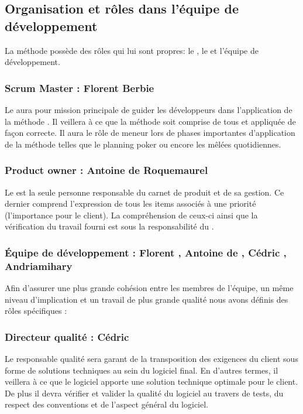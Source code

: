 \subsection{Organisation et rôles dans l'équipe de développement}
La méthode  possède des rôles qui lui sont propres: le , le  et l'équipe de développement. 

\subsubsection{Scrum Master : Florent Berbie}
Le  aura pour mission principale de guider les développeurs dans l'application de la méthode . Il veillera à ce que la méthode soit
comprise de tous et appliquée de façon correcte. Il aura le rôle de meneur lors de phases importantes d’application de la méthode telles que le
planning poker ou encore les mêlées quotidiennes.
\subsubsection{Product owner : Antoine de Roquemaurel}
Le  est la seule personne responsable du carnet de produit et de sa gestion. Ce dernier comprend l’expression de tous les items associés
à une priorité (l'importance pour le client). La compréhension de ceux-ci ainsi que la vérification du travail fourni est sous la responsabilité du
.
\subsubsection{Équipe de développement : Florent , Antoine de , Cédric
, Andriamihary }
Afin d’assurer une plus grande cohésion entre les membres de l’équipe, un même niveau d’implication et un travail de plus grande qualité nous avons
définis des rôles spécifiques : 
\subsubsection{Directeur qualité : Cédric }
Le responsable qualité sera garant de la transposition des exigences du client sous forme de solutions techniques au sein du logiciel final. En
d’autres termes, il veillera à ce que le logiciel apporte une solution technique optimale pour le client. De plus il devra vérifier et valider la
qualité du logiciel au travers de tests, du respect des conventions et de l'aspect général du logiciel.

